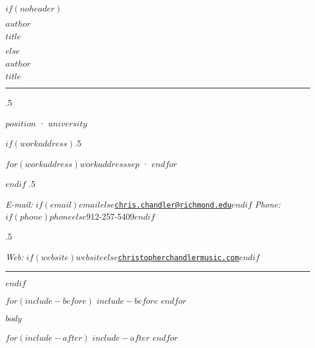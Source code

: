 \documentclass[plain, titleabove, $if(font-size)$$fontsize$$else$11pt$endif$]{simplecv}
\begin{document}
\thispagestyle{empty} 		%

$if(noheader)$
\centerline{\Large \textsc{$author$}}
\centerline{\textsc{$title$}}
\vspace{$if(parskip)$$parskip$$else$0.75em$endif$}
$else$
\centerline{\Large \textsc{$author$}}
\centerline{\textsc{$title$}}
\vspace{0.5em}
\hrule
\vspace{0.5em}
\moveleft.5\hoffset\centerline{$position$ · $university$}
$if(workaddress)$\moveleft.5\hoffset\centerline{$for(workaddress)$$workaddress$$sep$ · $endfor$}$endif$
\moveleft.5\hoffset\centerline{
\emph{E-mail:} \href{mailto:}{\tt $if(email)$$email$$else$chris.chandler@richmond.edu$endif$}
\hspace{0.5em}
\emph{Phone:} $if(phone)$$phone$$else$912-257-5409$endif$}
\moveleft.5\hoffset\centerline{
\emph{Web:} $if(website)$\href{$website$}{\tt $website$}$else$\href{http://christopherchandlermusic.com}{\tt christopherchandlermusic.com}$endif$}
\vspace{0.5em}
\hrule
\vspace{0.5em}
$endif$

$for(include-before)$
	$include-before$
$endfor$

$body$

$for(include-after)$
	$include-after$
$endfor$
\end{document}
